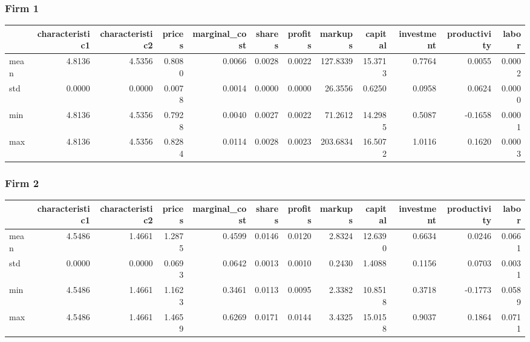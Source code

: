  \subsubsection*{Firm 1}
\begin{tabular}{lrrrrrrrrrrr}
\toprule
{} &  characteristic1 &  characteristic2 &  prices &  marginal\_cost &  shares &  profits &  markups &  capital &  investment &  productivity &  labor \\
\midrule
mean &           4.8136 &           4.5356 &  0.8080 &         0.0066 &  0.0028 &   0.0022 & 127.8339 &  15.3713 &      0.7764 &        0.0055 & 0.0002 \\
std  &           0.0000 &           0.0000 &  0.0078 &         0.0014 &  0.0000 &   0.0000 &  26.3556 &   0.6250 &      0.0958 &        0.0624 & 0.0000 \\
min  &           4.8136 &           4.5356 &  0.7928 &         0.0040 &  0.0027 &   0.0022 &  71.2612 &  14.2985 &      0.5087 &       -0.1658 & 0.0001 \\
max  &           4.8136 &           4.5356 &  0.8284 &         0.0114 &  0.0028 &   0.0023 & 203.6834 &  16.5072 &      1.0116 &        0.1620 & 0.0003 \\
\bottomrule
\end{tabular}


 \subsubsection*{Firm 2}
\begin{tabular}{lrrrrrrrrrrr}
\toprule
{} &  characteristic1 &  characteristic2 &  prices &  marginal\_cost &  shares &  profits &  markups &  capital &  investment &  productivity &  labor \\
\midrule
mean &           4.5486 &           1.4661 &  1.2875 &         0.4599 &  0.0146 &   0.0120 &   2.8324 &  12.6390 &      0.6634 &        0.0246 & 0.0661 \\
std  &           0.0000 &           0.0000 &  0.0693 &         0.0642 &  0.0013 &   0.0010 &   0.2430 &   1.4088 &      0.1156 &        0.0703 & 0.0031 \\
min  &           4.5486 &           1.4661 &  1.1623 &         0.3461 &  0.0113 &   0.0095 &   2.3382 &  10.8518 &      0.3718 &       -0.1773 & 0.0589 \\
max  &           4.5486 &           1.4661 &  1.4659 &         0.6269 &  0.0171 &   0.0144 &   3.4325 &  15.0158 &      0.9037 &        0.1864 & 0.0711 \\
\bottomrule
\end{tabular}


